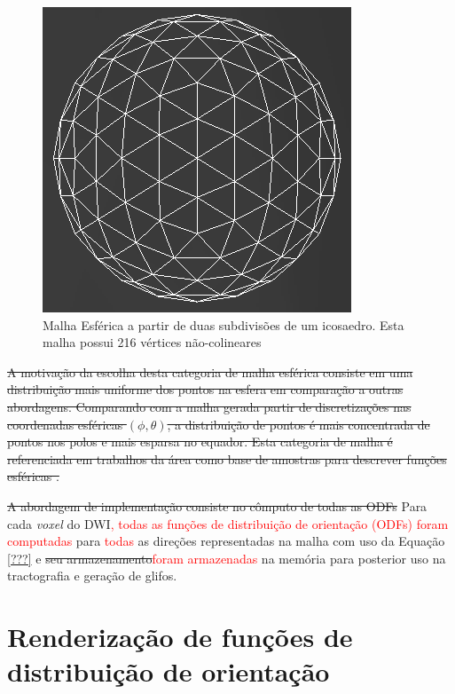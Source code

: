 \documentclass[
    12pt,                %
    oneside,            %
    a4paper,            %
    english,            %
    french,                %
    spanish,            %
    brazil                %
    ]{abntex2}
\begin{document}
\begin{figure}[ht]

    \centering
    \includegraphics[width=0.4\linewidth, angle=0]{figs/Exemplos_QBall_visualizacao/MeshEsfericoIco.png}
        \caption{Malha Esférica a partir de duas subdivisões de um icosaedro. Esta malha possui 216 vértices não-colineares}
    \label{fig::MalhaEsferico}
\end{figure}

\sout{A motivação da escolha desta categoria de malha esférica consiste em uma distribuição mais uniforme dos pontos na esfera em comparação a outras abordagens. Comparando com a malha gerada partir de discretizações nas coordenadas esféricas $(\phi, \theta)$, a distribuição de pontos é mais concentrada de pontos nos polos e mais esparsa no equador. Esta categoria de malha é referenciada em trabalhos da área como base de amostras para descrever funções esféricas \cite{TuchQBall2004, descoteaux2007_QBI, yeh2010}.}


\sout{A abordagem de implementação consiste no cômputo de todas as ODFs} Para cada \textit{voxel} do DWI\textcolor{red}{, todas as funções de distribuição de orientação (ODFs) foram computadas} para \textcolor{red}{todas} as direções representadas na malha com uso da Equação \ref{???} e \sout{seu armazenamento}\textcolor{red}{foram armazenadas} na memória para posterior uso na tractografia e geração de glifos.


\section{Renderização de funções de distribuição de orientação}
\end{document}
